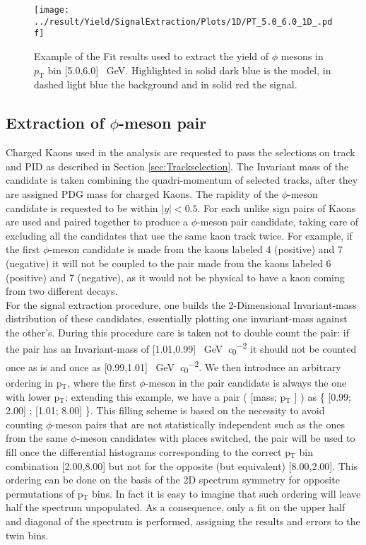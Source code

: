\begin{figure}
\centering
\texttt{[image: ../result/Yield/SignalExtraction/Plots/1D/PT\_5.0\_6.0\_1D\_.pdf]}
\caption{Example of the Fit results used to extract the yield of $\phi$ mesons in $p_{\text{T}}$ bin [5.0,6.0] \SI{}{\giga\electronvolt}. Highlighted in solid dark blue is the model, in dashed light blue the background and in solid red the signal.}
\label{fig:1Dfit}
\end{figure}

\subsection{Extraction of $\phi$-meson pair}
Charged Kaons used in the analysis are requested to pass the selections on track and PID as described in Section \ref{sec:Trackselection}. The Invariant mass of the candidate is taken combining the quadri-momentum of selected tracks, after they are assigned PDG mass for charged Kaons. The rapidity of the $\phi$-meson candidate is requested to be within $|y| < 0.5$. For each unlike sign pairs of Kaons are used and paired together to produce a $\phi$-meson pair candidate, taking care of excluding all the candidates that use the same kaon track twice. For example, if the first $\phi$-meson candidate is made from the kaons labeled 4 (positive) and 7 (negative) it will not be coupled to the pair made from the kaons labeled 6 (positive) and 7 (negative), as it would not be physical to have a kaon coming from two different decays.\\
\indent For the signal extraction procedure, one builds the 2-Dimensional Invariant-mass distribution of these candidates, essentially plotting one invariant-mass against the other's. During this procedure care is taken not to double count the pair: if the pair has an Invariant-mass of [1.01,0.99] \SI{}{\giga\electronvolt\per\clight\squared} it should not be counted once as is and once as [0.99,1.01] \SI{}{\giga\electronvolt\per\clight\squared}. We then introduce an arbitrary ordering in p$_{\text{T}}$, where the first $\phi$-meson in the pair candidate is always the one with lower p$_{\text{T}}$: extending this example, we have a pair ( [mass; p$_{\text{T}}$ ] ) as  \{ [0.99; 2.00]  ; [1.01; 8.00] \}. This filling scheme is based on the necessity to avoid counting $\phi$-meson pairs that are not statistically independent such as the ones from the same $\phi$-meson candidates with places switched, the pair will be used to fill once the differential histograms corresponding to the correct p$_{\text{T}}$ bin combination [2.00,8.00] but not for the opposite (but equivalent) [8.00,2.00]. This ordering can be done on the basis of the 2D spectrum symmetry for opposite permutations of p$_{\text{T}}$ bins. In fact it is easy to imagine that such ordering will leave half the spectrum unpopulated. As a consequence, only a fit on the upper half and diagonal of the spectrum is performed, assigning the results and errors to the twin bins.\\
